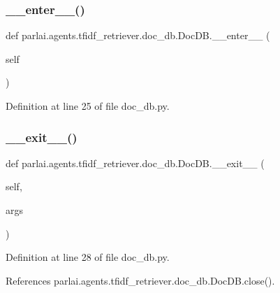 \subsubsection{\texorpdfstring{\+\_\+\+\_\+enter\+\_\+\+\_\+()}{\_\_enter\_\_()}}
{\footnotesize\ttfamily def parlai.\+agents.\+tfidf\+\_\+retriever.\+doc\+\_\+db.\+Doc\+D\+B.\+\_\+\+\_\+enter\+\_\+\+\_\+ (\begin{DoxyParamCaption}\item[{}]{self }\end{DoxyParamCaption})}



Definition at line 25 of file doc\+\_\+db.\+py.

\mbox{\label{classparlai_1_1agents_1_1tfidf__retriever_1_1doc__db_1_1DocDB_af49bf8bf55469fe2dbd2d4d5f3e48ba9}} 
\subsubsection{\texorpdfstring{\+\_\+\+\_\+exit\+\_\+\+\_\+()}{\_\_exit\_\_()}}
{\footnotesize\ttfamily def parlai.\+agents.\+tfidf\+\_\+retriever.\+doc\+\_\+db.\+Doc\+D\+B.\+\_\+\+\_\+exit\+\_\+\+\_\+ (\begin{DoxyParamCaption}\item[{}]{self,  }\item[{}]{args }\end{DoxyParamCaption})}



Definition at line 28 of file doc\+\_\+db.\+py.



References parlai.\+agents.\+tfidf\+\_\+retriever.\+doc\+\_\+db.\+Doc\+D\+B.\+close().


